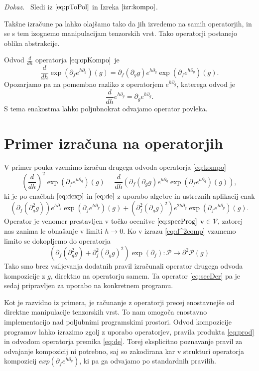 \documentclass[a4paper, 12pt]{book}
\newcommand{\VV}{\mathcal{V}}
\newcommand{\vv}{\mathbf{v}}
\newcommand{\dP}{\mathcal{P}}
\newcommand{\D}{\partial}
\newenvironment{dokaz}{\emph{Dokaz.}\ }{\hspace{\fill}{$\Box$}}
\begin{document}
   \begin{dokaz}
   Sledi iz $\eqref{eq:pToPol}$ in Izreka $\ref{izr:kompo}$.
   \end{dokaz}

Takšne izračune pa lahko olajšamo tako da jih izvedemo na samih operatorjih, in se s tem izognemo manipulacijam tenzorskih vrst. Tako operatorji postanejo oblika abstrakcije. 

\noindent Odvod $\frac{d}{dh}$ operatorja $\eqref{eq:opKompo}$ je
\begin{equation}\label{eq:dexp}
 \frac{d}{dh}\exp(\D_fe^{h\D_g})(g)=\D_f(\D_gg)e^{h\D_g}\exp(\D_fe^{h\D_g})(g).
 \end{equation}
Opozarjamo pa na pomembno razliko z operatorjem $e^{h\D_g}$, katerega odvod je
 \begin{equation}\label{eq:de}
\frac{d}{dh}e^{h\D_g}=\D_ge^{h\D_g}.
 \end{equation}
 S tema enakostma lahko poljubnokrat odvajamo operator povleka.
 
 \section{Primer izračuna na operatorjih}

V primer pouka vzemimo izračun drugega odvoda operatorja \eqref{eq:kompo}
$$\left(\frac{d}{dh}\right)^2\exp\left(\D_fe^{h\D_g}\right)(g)=\frac{d}{dh}\left(\D_f(\D_gg)e^{h\D_g}\exp\left(\D_fe^{h\D_g}\right)(g)\right),$$
ki je po enačbah $\eqref{eq:dexp}$ in $\eqref{eq:de}$ z uporabo algebre in ustreznih aplikacij enak
\begin{equation}\label{eq:d^2comp}
 \left(\D_f(\D^2_gg)\right)e^{h\D_g}\exp(\D_fe^{h\D_g})(g)+(\D^2_f(\D_gg)^2)e^{2h\D_g}\exp(\D_fe^{h\D_g})(g).
 \end{equation}
Operator je venomer prestavljen v točko ocenitve $\eqref{eq:specProg}$ $\vv\in\VV$, zatorej nas zanima le obnašanje v limiti $h\to 0$. Ko v izrazu \eqref{eq:d^2comp} vzamemo limito se dokopljemo do operatorja
 \begin{equation}\label{eq:secDer}
	\left(\D_f(\D^2_gg)+\D^2_f(\D_gg)^2\right)\exp(\D_f):\dP\to\D^2\dP(g)
 \end{equation}
Tako smo brez vsiljevanja dodatnih pravil izračunali operator drugega odvoda kompozicije z $g$, direktno na operatorju samem. Ta operator \eqref{eq:secDer} pa je sedaj pripravljen za uporabo na konkretnem programu.

Kot je razvidno iz primera, je računanje z operatorji precej enostavnejše od direktne manipulacije tenzorskih vrst. To nam omogoča enostavno implementacijo nad poljubnimi programskimi prostori. Odvod kompozicije programov lahko izrazimo zgolj z uporabo operatorjev, pravila produkta \eqref{eq:prod} in odvodom operatorja premika \eqref{eq:de}. Torej eksplicitno poznavanje pravil za odvajanje kompozicij ni potrebno, saj so zakodirana kar v strukturi operatorja kompozicij $exp(\D_fe^{h\D_g})$, ki pa ga odvajamo po standardnih pravilih.
\end{document}
